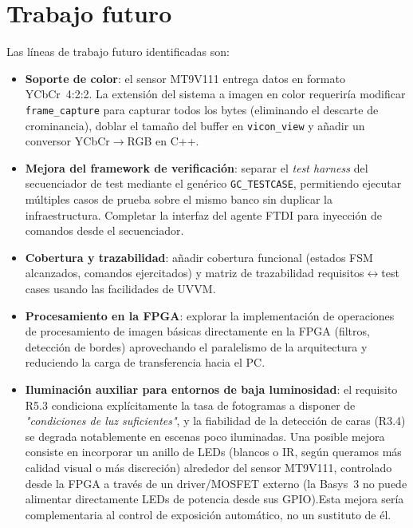 \documentclass[../main.tex]{subfiles}
\begin{document}
\section{Trabajo futuro}

Las líneas de trabajo futuro identificadas son:

\begin{itemize}
    \item \textbf{Soporte de color}: el sensor MT9V111 entrega datos en formato YCbCr~4:2:2. La extensión del sistema a imagen en color requeriría modificar \texttt{frame\_capture} para capturar todos los bytes (eliminando el descarte de crominancia), doblar el tamaño del buffer en \texttt{vicon\_view} y añadir un conversor YCbCr$\rightarrow$RGB en C++.

    \item \textbf{Mejora del framework de verificación}: separar el \textit{test harness} del secuenciador de test mediante el genérico \texttt{GC\_TESTCASE}, permitiendo ejecutar múltiples casos de prueba sobre el mismo banco sin duplicar la infraestructura. Completar la interfaz del agente FTDI para inyección de comandos desde el secuenciador.

    \item \textbf{Cobertura y trazabilidad}: añadir cobertura funcional (estados FSM alcanzados, comandos ejercitados) y matriz de trazabilidad requisitos$\leftrightarrow$test cases usando las facilidades de UVVM.

    \item \textbf{Procesamiento en la FPGA}: explorar la implementación de operaciones de procesamiento de imagen básicas directamente en la FPGA (filtros, detección de bordes) aprovechando el paralelismo de la arquitectura y reduciendo la carga de transferencia hacia el PC.
    
    \item \textbf{Iluminación auxiliar para entornos de baja luminosidad}: el requisito R5.3 condiciona explícitamente la tasa de fotogramas a disponer de \emph{"condiciones de luz suficientes"}, y la fiabilidad de la detección de caras (R3.4) se degrada notablemente en escenas poco iluminadas. Una posible mejora consiste en incorporar un anillo de LEDs (blancos o IR, según queramos más calidad visual o más discreción) alrededor del sensor MT9V111, controlado desde la FPGA a través de un driver/MOSFET externo (la Basys~3 no puede alimentar directamente LEDs de potencia desde sus GPIO).Esta mejora sería complementaria al control de exposición automático, no un sustituto de él.

    
\end{itemize}
\end{document}
